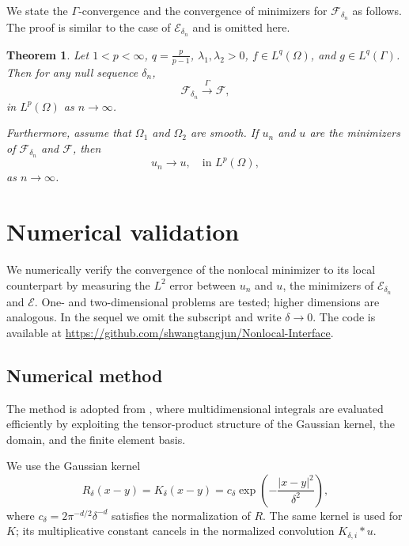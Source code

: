 \documentclass{article}
\newtheorem{theorem}{Theorem}
\theoremstyle{definition}
\begin{document}
We state the $\Gamma$-convergence and the convergence of minimizers for $\mathcal{F}_{\delta_n}$ as follows. The proof is similar to the case of $\mathcal{E}_{\delta_n}$ and is omitted here.
\begin{theorem}
  Let $1<p<\infty$, $q=\frac{p}{p-1}$, $\lambda_1, \lambda_2>0$, $f\in L^q(\Omega)$, and $g\in L^q(\Gamma)$. Then for any null sequence $\delta_n$,
  \begin{equation*}
    \mathcal{F}_{\delta_n}\stackrel{\Gamma}{\longrightarrow }\mathcal{F},
  \end{equation*}
  in $L^p(\Omega)$ as $n\rightarrow\infty$.

  Furthermore, assume that $\Omega_1$ and $\Omega_2$ are smooth. If $u_n$ and $u$ are the minimizers of $\mathcal{F}_{\delta_n}$ and $\mathcal{F}$, then
   \[
   u_n\rightarrow u,\quad \mbox{in } L^p(\Omega),
   \]
   as $n\rightarrow\infty$.
\end{theorem}

\section{Numerical validation}
We numerically verify the convergence of the nonlocal minimizer to its local counterpart by measuring the $L^2$ error between $u_n$ and $u$, the minimizers of $\mathcal{E}_{\delta_n}$ and $\mathcal{E}$. One- and two-dimensional problems are tested; higher dimensions are analogous. In the sequel we omit the subscript and write $\delta\to0$. The code is available at \url{https://github.com/shwangtangjun/Nonlocal-Interface}.

\subsection{Numerical method}
The method is adopted from \cite{gan2025nonlocal}, where multidimensional integrals are evaluated efficiently by exploiting the tensor-product structure of the Gaussian kernel, the domain, and the finite element basis.

We use the Gaussian kernel
\[
  R_\delta(x-y)=K_\delta(x-y)=c_\delta
  \exp\left(-\frac{|x-y|^2}{\delta^2}\right),
\]
where $c_\delta=2 \pi^{-d/2}\delta^{-d}$ satisfies the normalization of $R$. The same kernel is used for $K$; its multiplicative constant cancels in the normalized convolution $K_{\delta,i}\ast u$.
\end{document}
